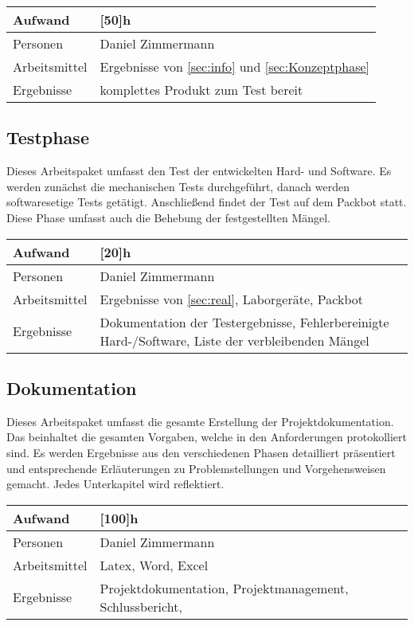 \begin{tabularx}{\textwidth}{|l|X|}
		\hline
		Aufwand & [50]{h} \\\hline
		Personen & Daniel Zimmermann \\\hline
		Arbeitsmittel & Ergebnisse von \ref{sec:info} und \ref{sec:Konzeptphase} \\\hline
		Ergebnisse &  komplettes Produkt zum Test bereit\\\hline
\end{tabularx}
	
	\subsection{Testphase}
	\label{sec:test}
	Dieses Arbeitspaket umfasst den Test der entwickelten Hard- und Software.
	Es werden zunächst die mechanischen Tests durchgeführt, danach  werden softwaresetige Tests getätigt.
	Anschließend findet der Test auf dem Packbot statt. Diese Phase umfasst auch die Behebung der festgestellten Mängel. \\
	
	\begin{tabularx}{\textwidth}{|l|X|}
		\hline
		Aufwand & [20]{h} \\\hline
		Personen & Daniel Zimmermann\\\hline
		Arbeitsmittel & Ergebnisse von \ref{sec:real}, Laborgeräte, Packbot\\\hline
		Ergebnisse & Dokumentation der Testergebnisse, Fehlerbereinigte Hard-/Software, Liste der verbleibenden Mängel \\\hline
	\end{tabularx}
	
	\subsection{Dokumentation}
	\label{sec:doku}
	Dieses Arbeitspaket umfasst die gesamte Erstellung der Projektdokumentation. Das beinhaltet die gesamten Vorgaben, welche in den Anforderungen protokolliert sind. Es werden Ergebnisse aus den verschiedenen Phasen detailliert präsentiert und entsprechende Erläuterungen zu Problemstellungen und Vorgehensweisen gemacht. Jedes Unterkapitel wird reflektiert. \\
	
	\begin{tabularx}{\textwidth}{|l|X|}
		\hline
		Aufwand & [100]{h} \\\hline
		Personen & Daniel Zimmermann \\\hline
		Arbeitsmittel & Latex, Word, Excel \\\hline
		Ergebnisse & Projektdokumentation, Projektmanagement, Schlussbericht,  \\\hline
	\end{tabularx}
	
